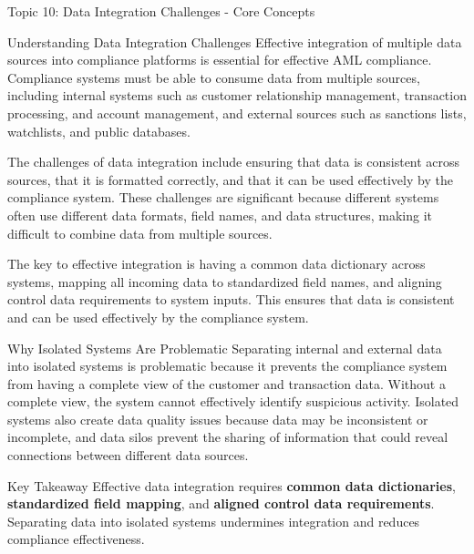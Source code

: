 \documentclass[5pt]{beamer}
\begin{document}
	\begin{frame}{Topic 10: Data Integration Challenges - Core Concepts}
		\begin{block}{\tiny Understanding Data Integration Challenges}
			\tiny Effective integration of multiple data sources into compliance platforms is essential for effective AML compliance. Compliance systems must be able to consume data from multiple sources, including internal systems such as customer relationship management, transaction processing, and account management, and external sources such as sanctions lists, watchlists, and public databases.
			
			The challenges of data integration include ensuring that data is consistent across sources, that it is formatted correctly, and that it can be used effectively by the compliance system. These challenges are significant because different systems often use different data formats, field names, and data structures, making it difficult to combine data from multiple sources.
			
			The key to effective integration is having a common data dictionary across systems, mapping all incoming data to standardized field names, and aligning control data requirements to system inputs. This ensures that data is consistent and can be used effectively by the compliance system.
		\end{block}
		
		\begin{block}{\tiny Why Isolated Systems Are Problematic}
			\tiny Separating internal and external data into isolated systems is problematic because it prevents the compliance system from having a complete view of the customer and transaction data. Without a complete view, the system cannot effectively identify suspicious activity. Isolated systems also create data quality issues because data may be inconsistent or incomplete, and data silos prevent the sharing of information that could reveal connections between different data sources.
		\end{block}
		
		\begin{alertblock}{Key Takeaway}
			\tiny Effective data integration requires \textbf{common data dictionaries}, \textbf{standardized field mapping}, and \textbf{aligned control data requirements}. Separating data into isolated systems undermines integration and reduces compliance effectiveness.
		\end{alertblock}
	\end{frame}
	
\end{document}
